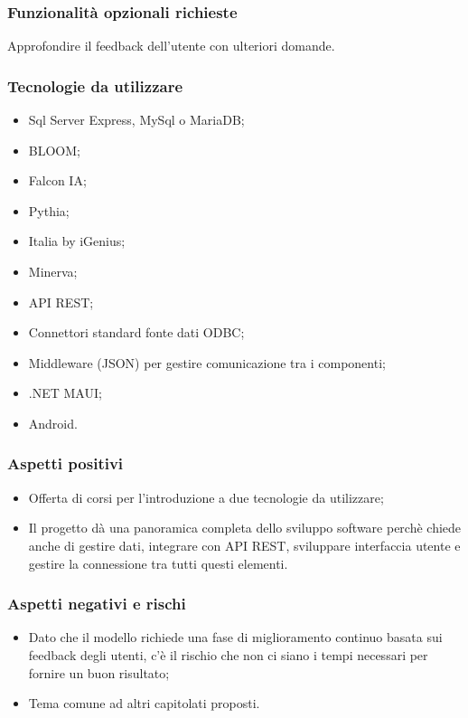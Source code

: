 \documentclass[10pt]{article}
\begin{document}
\subsubsection{Funzionalità opzionali richieste}
Approfondire il feedback dell’utente con ulteriori domande.
\subsubsection{Tecnologie da utilizzare}
\begin{itemize}
    \item Sql Server Express, MySql o MariaDB;
    \item BLOOM;
    \item Falcon IA;
    \item Pythia;
    \item Italia by iGenius;
    \item Minerva;
    \item API REST;
    \item Connettori standard fonte dati ODBC;
    \item Middleware (JSON) per gestire comunicazione tra i componenti;
    \item .NET MAUI;
    \item Android.
\end{itemize}
\subsubsection{Aspetti positivi}
\begin{itemize}
    \item Offerta di corsi per l’introduzione a due tecnologie da utilizzare;
    \item Il progetto dà una panoramica completa dello sviluppo software perchè chiede anche di gestire dati, integrare con API REST, sviluppare interfaccia utente e gestire la connessione tra tutti questi elementi.
\end{itemize}
\subsubsection{Aspetti negativi e rischi}
\begin{itemize}
    \item Dato che il modello richiede una fase di miglioramento continuo basata sui feedback degli utenti, c’è il rischio che non ci siano i tempi necessari per fornire un buon risultato;
    \item Tema comune ad altri capitolati proposti.
\end{itemize}
\end{document}
